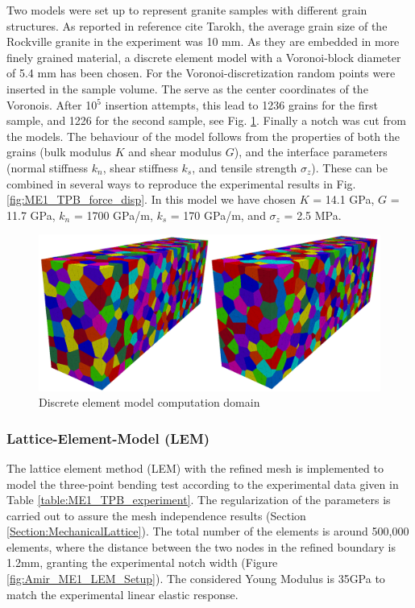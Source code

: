 Two models were set up to represent granite samples with different grain structures. As reported in reference cite Tarokh, the average grain size of the Rockville granite in the experiment was 10 mm. 
As they are embedded in more finely grained material, a discrete element model with a Voronoi-block diameter of 5.4 mm has been chosen. For the Voronoi-discretization random points were inserted in the sample volume. 
The serve as the center coordinates of the Voronois. After 10$^5$ insertion attempts, this lead to 1236 grains for the first sample, and 1226 for the second sample, see Fig. \ref{fig:ME1_TPB_DEM_domain}. Finally a notch was cut from the models. The behaviour of the model follows from the properties of both the grains (bulk modulus $K$ and shear modulus $G$), and the interface parameters (normal stiffness $k_n$, shear stiffness $k_s$, and tensile strength $\sigma_z$). These can be combined in several ways to reproduce the experimental results in Fig. \ref{fig:ME1_TPB_force_disp}. In this model we have chosen $K$ = 14.1 GPa, $G$ = 11.7 GPa, $k_n$ = 1700 GPa/m, $k_s$ = 170 GPa/m, and $\sigma_z$ = 2.5 MPa. 

\begin{figure}[!ht]
\centering
\includegraphics[width=1\textwidth]{figures/ME1-DEM-samples.png}
\caption{Discrete element model computation domain}
\label{fig:ME1_TPB_DEM_domain}
\end{figure}

\subsubsection*{Lattice-Element-Model (LEM)}

The lattice element method (LEM) with the refined mesh is implemented to model the three-point bending test according to the experimental data given in Table \ref{table:ME1_TPB_experiment}. The regularization of the parameters is carried out to assure the mesh independence results (Section \ref{Section:MechanicalLattice}). The total number of the elements is around 500,000 elements, where the distance between the two nodes in the refined boundary is 1.2mm, granting the experimental notch width (Figure \ref{fig:Amir_ME1_LEM_Setup}). The considered Young Modulus is 35GPa to match the experimental linear elastic response.

